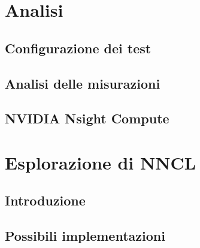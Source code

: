 \documentclass[a4paper]{article}
\begin{document}
\section{Analisi}

\subsection{Configurazione dei test}

\subsection{Analisi delle misurazioni}

\subsection{NVIDIA Nsight Compute}

\section{Esplorazione di NNCL}

\subsection{Introduzione}

\subsection{Possibili implementazioni}

\printbibliography
\end{document}

